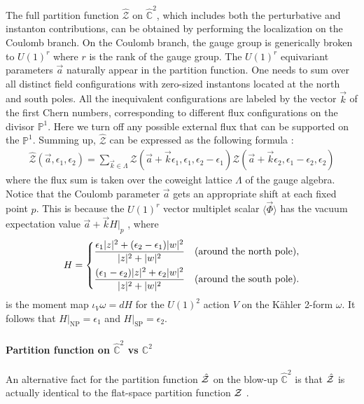 \documentclass[letterpaper, 11pt]{article}
\def\IC{\mathbb{C}}
\def\IP{\mathbb{P}}
\def\CZ{{\cal Z}}
\def\e{\epsilon}
\begin{document}
The full partition function $\hat{\mathcal Z}$ on $\hat{\IC}^2$, which includes both the perturbative and instanton contributions, can be obtained by performing the localization on the Coulomb branch. On the Coulomb branch, the gauge group is generically broken to $U(1)^r$ where $r$ is the rank of the gauge group. The $U(1)^r$ equivariant parameters $\vec{a}$ naturally appear in the partition function. One needs to sum over all distinct field configurations with zero-sized instantons located at the north and south poles. All the inequivalent configurations are labeled by the vector $\vec{k}$ of the first Chern numbers, corresponding to different flux configurations on the divisor $\mathbb{P}^1$. Here we turn off any possible external flux that can be supported on the $\IP^1$. 
Summing up, $\hat{\mathcal Z}$ can be expressed as the following formula \cite{Nekrasov:2003vi, Gottsche:2006bm, Gottsche:2006tn, Gasparim:2008ri, Bonelli:2012ny}:
\begin{align} \label{eq:blowup}
  \hat{\mathcal Z}(\vec{a}, \e_1, \e_2) = \sum_{\vec{k} \in \Lambda} {\mathcal Z}(\vec{a}+ \vec{k} \e_1, \e_1, \e_2 - \e_1) {\mathcal Z}(\vec{a}+\vec{k} \e_2, \e_1 - \e_2, \e_2) 
 \end{align}
 where the flux sum is taken over the coweight lattice $\Lambda$  of the gauge algebra. Notice that the Coulomb parameter $\vec{a}$ gets an appropriate shift at each fixed point $p$. This is because the $U(1)^r$ vector multiplet scalar $\langle \vec{\Phi}\rangle $ has the vacuum expectation value $\vec{a} + \vec{k}H|_p$ \cite{Bershtein:2015xfa}, where 
 \begin{align}
  \label{eq:moment-map}
  H = 
  \begin{dcases}
     \frac{\epsilon_1|z|^2+ (\epsilon_2 - \epsilon_1)|w|^2}{|z|^2+|w|^2} & \text{(around the north pole)},\\
   \frac{(\epsilon_1-\epsilon_2)|z|^2+ \epsilon_2|w|^2}{|z|^2+|w|^2} & \text{(around the south pole)}.
  \end{dcases}
\end{align}
is the moment map $\iota_V \omega = dH$ for the  $U(1)^2$ action $V$ on the K\"ahler 2-form $\omega$. It follows that  $H|_\text{NP} = \epsilon_1$ and $H|_\text{SP} = \epsilon_2$.

\paragraph{Partition function on $\hat{\IC}^2$ vs $\IC^2$}
An alternative fact for the partition function $\hat{\CZ}$ on the blow-up $\hat{\IC}^2$ is that $\hat{\CZ}$ is actually identical to the flat-space partition function $\CZ$  \cite{Nakajima:2003pg, Nakajima:2003uh,Nakajima:2005fg}.
 
\end{document}
